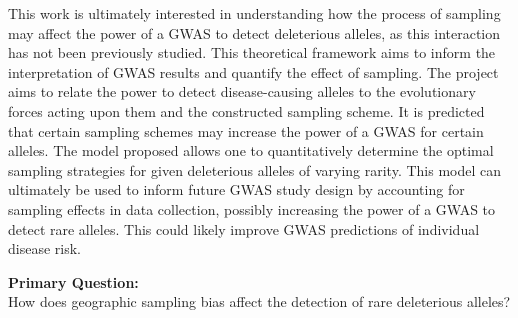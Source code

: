 This work is ultimately interested in understanding how the process of sampling may affect the power of a GWAS to detect deleterious alleles, as this interaction has not been previously studied. This theoretical framework aims to inform the interpretation of GWAS results and quantify the effect of sampling. The project aims to relate the power to detect disease-causing alleles to the evolutionary forces acting upon them and the constructed sampling scheme. It is predicted that certain sampling schemes may increase the power of a GWAS for certain alleles. The model proposed allows one to quantitatively determine the optimal sampling strategies for given deleterious alleles of varying rarity. This model can ultimately be used to inform future GWAS study design by accounting for sampling effects in data collection, possibly increasing the power of a GWAS to detect rare alleles. This could likely improve GWAS predictions of individual disease risk.


\begin{center}
    \textbf{Primary Question:} \\
    How  does geographic sampling bias affect the detection of rare deleterious alleles?
\end{center}